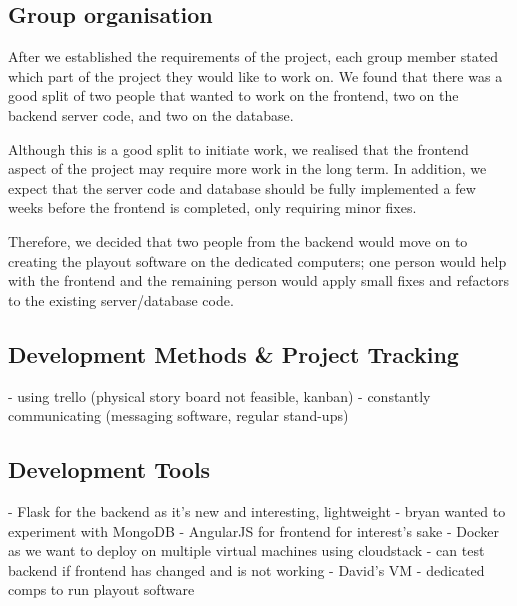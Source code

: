 \documentclass[a4paper]{article}
\begin{document}
\subsection{Group organisation}
After we established the requirements of the project, each group member stated
which part of the project they would like to work on. We found that there was a
good split of two people that wanted to work on the frontend, two on the backend
server code, and two on the database.

Although this is a good split to initiate work, we realised that the frontend 
aspect of the project may require more work in the long term. In addition, we 
expect that the server code and database should be fully implemented a few
weeks before the frontend is completed, only requiring minor fixes.

Therefore, we decided that two people from the backend would move on to creating
the playout software on the dedicated computers; one person would help with the
frontend and the remaining person would apply small fixes and refactors to the
existing server/database code. 


\subsection{Development Methods \& Project Tracking}
  - using trello (physical story board not feasible, kanban)
  - constantly communicating (messaging software, regular stand-ups)

\subsection{Development Tools}
 	- Flask for the backend as it's new and interesting, lightweight
	- bryan wanted to experiment with MongoDB
	- AngularJS for frontend for interest's sake
	- Docker as we want to deploy on multiple virtual machines using cloudstack
	- can test backend if frontend has changed and is not working
  - David's VM
	- dedicated comps to run playout software
\end{document}
